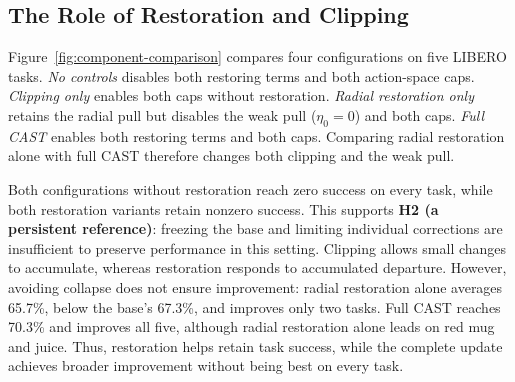 



\subsection{The Role of Restoration and Clipping}
\label{sec:exp-controls}


Figure~\ref{fig:component-comparison} compares four configurations on five LIBERO tasks. \emph{No controls} disables both restoring terms and both action-space caps. \emph{Clipping only} enables both caps without restoration. \emph{Radial restoration only} retains the radial pull but disables the weak pull ($\eta_0=0$) and both caps. \emph{Full CAST} enables both restoring terms and both caps. Comparing radial restoration alone with full CAST therefore changes both clipping and the weak pull.

Both configurations without restoration reach zero success on every task, while both restoration variants retain nonzero success. This supports \textbf{H2  (a persistent reference)}: freezing the base and limiting individual corrections are insufficient to preserve performance in this setting. Clipping allows small changes to accumulate, whereas restoration responds to accumulated departure. However, avoiding collapse does not ensure improvement: radial restoration alone averages 65.7\%, below the base's 67.3\%, and improves only two tasks. Full CAST reaches 70.3\% and improves all five, although radial restoration alone leads on red mug and juice. Thus, restoration helps retain task success, while the complete update achieves broader improvement without being best on every task.



% 


